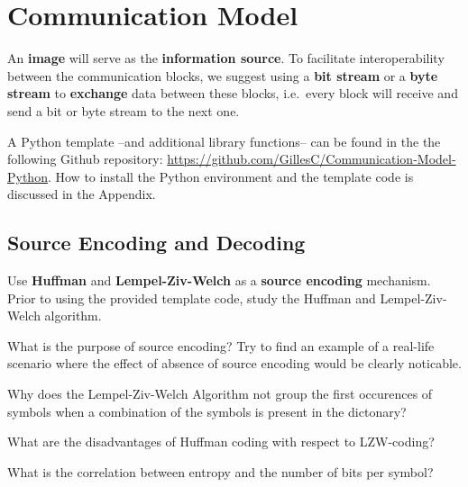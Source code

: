 \documentclass[12pt,a4paper]{article}
\begin{document}
\section{Communication Model}
An \textbf{image} will serve as the \textbf{information source}. 
To facilitate interoperability between the communication blocks, we suggest using a \textbf{bit stream} or a \textbf{byte stream} to \textbf{exchange} data between these blocks, i.e.\ every block will receive and send a bit or byte stream to the next one. %

A Python template --and additional library functions-- can be found in the the following Github repository: \url{https://github.com/GillesC/Communication-Model-Python}. How to install the Python environment and the template code is discussed in the Appendix.

\subsection{Source Encoding and Decoding}
Use \textbf{Huffman} and \textbf{Lempel-Ziv-Welch} as a \textbf{source encoding} mechanism. Prior to using the provided template code, study the Huffman and Lempel-Ziv-Welch algorithm. 


\begin{question}
	What is the purpose of source encoding? Try to find an example of a real-life scenario where the effect of absence of source encoding would be clearly noticable.
\end{question}

\begin{question}
	Why does the Lempel-Ziv-Welch Algorithm not group the first occurences of symbols when a combination of the symbols is present in the dictonary?
\end{question}

\begin{question}
	What are the disadvantages of Huffman coding with respect to LZW-coding?
\end{question}

\begin{question}
	What is the correlation between entropy and the number of bits per symbol? 
\end{question}
\end{document}

